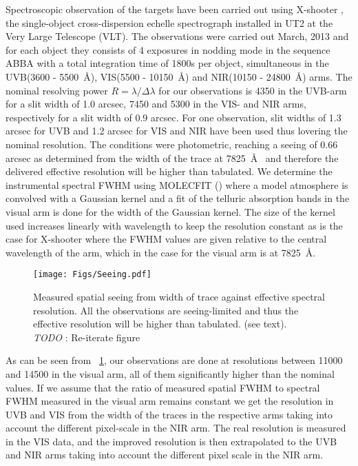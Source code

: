 \documentclass{aa}    %
\newcommand{\figref}[1]{\ref{fig:#1}}
\newcommand{\Fig}[1]{\figurename~\figref{#1}}
\newcommand{\fig}[1]{\Fig{#1}}
\newcommand{\figlabel}[1]{\label{fig:#1}}
\newcommand{\todo}[3]{{\color{#2}\emph{#1}: #3}}
\newcommand{\jstodo}[1]{\todo{ \\TODO }{green}{#1}}
\begin{document}
Spectroscopic observation of the targets have been carried out using X-shooter \citep{Vernet2011}, the single-object cross-dispersion echelle spectrograph installed in UT2 at the Very Large Telescope (VLT). The observations were carried out March, 2013 and for each object they consists of 4 exposures in nodding mode in the sequence ABBA with a total integration time of 1800s per object, simultaneous in the UVB(3600 - 5500~\AA), VIS(5500 - 10150~\AA)  and NIR(10150 - 24800~\AA) arms. The nominal resolving power $R = \lambda / \Delta \lambda$ for our observations is 4350 in the UVB-arm for a slit width of 1.0 arcsec, 7450 and 5300 in the VIS- and NIR arms, respectively for a slit width of 0.9 arcsec. For one observation, slit widths of 1.3 arcsec for UVB and 1.2 arcsec for VIS and NIR have been used thus lovering the nominal resolution. The conditions were photometric, reaching a seeing of 0.66 arcsec as determined from the width of the trace at 7825~\AA~ and therefore the delivered effective resolution will be higher than tabulated. We determine the instrumental spectral FWHM using MOLECFIT (\cite{Smette2015, Kausch2015}) where a model atmosphere is convolved with a Gaussian kernel and a fit of the telluric absorption bands in the visual arm is done for the width of the Gaussian kernel. The size of the kernel used increases linearly with wavelength to keep the resolution constant as is the case for X-shooter where the FWHM values are given relative to the central wavelength of the arm, which in the case for the visual arm is at 7825~\AA. 


\begin{figure}[hbtp]
  \centering
  \texttt{[image: Figs/Seeing.pdf]}
  \caption[]{Measured spatial seeing from width of trace against effective spectral resolution. All the observations are seeing-limited and thus the effective resolution will be higher than tabulated. (see text). \jstodo{Re-iterate figure} }
\figlabel{seeing}
\end{figure}



As can be seen from \fig{seeing}, our observations are done at resolutions between 11000 and 14500 in the visual arm, all of them significantly higher than the nominal values. If we assume that the ratio of measured spatial FWHM to spectral FWHM measured in the visual arm remains constant we get the resolution in UVB and VIS from the width of the traces in the respective arms taking into account the different pixel-scale in the NIR arm. The real resolution is measured in the VIS data, and the improved resolution is then extrapolated to the UVB and NIR arms taking into account the different pixel scale in the NIR arm.
\end{document}

